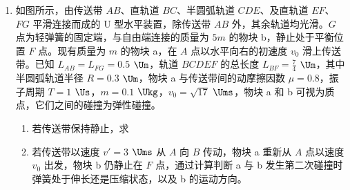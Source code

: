 \documentclass[\gkver]{gaokaozhenti}
\begin{document}
\begin{enumerate}
{（2）根据热力学第一定律，气体内能变化满足 $\Delta U=W+Q$

将已知 $\Delta U=2.2\times10^{3}$ $\UJ$、$Q=1.8\times10^{3}$ $\UJ$ 代入

解得 $W=\Delta U-Q=(2.2\times10^{3}-1.8\times10^{3})\,\UJ=400\,\UJ$

（3）理想气体的内能宏观上只和温度有关。平台匀速上升属于宏观机械运动，不会改变气体分子的无规则热运动剧烈程度，气体温度不变，因此内能不变。

气体分子的无规则热运动是各向同性的，平台匀速上升的宏观运动不会破坏分子热运动的统计均匀性，因此相对于汽缸，向上运动的分子数目近似等于向下运动的分子数目。
}

\item
如图所示，由传送带 $AB$、直轨道 $BC$、半圆弧轨道 $CDE$、及直轨道 $EF$、$FG$ 平滑连接而成的 U 型水平装置，除传送带 $AB$ 外，其余轨道均光滑。$G$ 点为轻弹簧的固定端，与自由端连接的质量为 $5m$ 的物块 b，静止处于平衡位置 $F$ 点。现有质量为 $m$ 的物块 a，在 $A$ 点以水平向右的初速度 $v_{0}$ 滑上传送带。已知 $L_{AB}=L_{FG}=0.5$ $\Um$，轨道 $BCDEF$ 的总长度 $L_{BF}=\frac{7}{4}$ $\Um$，其中半圆弧轨道半径 $R=0.3$ $\Um$，物块 a 与传送带间的动摩擦因数 $\mu=0.8$，振子周期 $T=1$ $\Us$，$m=0.1$ $\Ukg$，$v_{0}=\sqrt{17}$ $\Ums$，物块 a 和 b 可视为质点，它们之间的碰撞为弹性碰撞。
\begin{enumerate}
	\item
	若传送带保持静止，求
	\item
	若传送带以速度 $v'=3$ $\Ums$ 从 $A$ 向 $B$ 传动，物块 a 重新从 $A$ 点以速度 $v_{0}$ 出发，物块 b 仍静止在 $F$ 点，通过计算判断 a 与 b 发生第二次碰撞时弹簧处于伸长还是压缩状态，以及 b 的运动方向。
\end{enumerate}
\end{enumerate}
\end{document}
